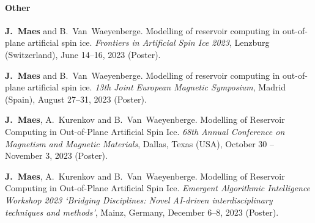 \paragraph*{Other}
\begin{itemize}
    \textbf{J.~Maes} and B.~Van~Waeyenberge.
    \newblock Modelling of reservoir computing in out-of-plane artificial spin ice.
    \newblock \emph{Frontiers in Artificial Spin Ice 2023}, Lenzburg (Switzerland), June 14--16, 2023 (Poster).

    \textbf{J.~Maes} and B.~Van~Waeyenberge.
    \newblock Modelling of reservoir computing in out-of-plane artificial spin ice.
    \newblock \emph{13th Joint European Magnetic Symposium}, Madrid (Spain), August 27--31, 2023 (Poster).

    \textbf{J.~Maes}, A.~Kurenkov and B.~Van~Waeyenberge.
    \newblock Modelling of Reservoir Computing in Out-of-Plane Artificial Spin Ice.
    \newblock \emph{68th Annual Conference on Magnetism and Magnetic Materials}, Dallas, Texas (USA), October 30 -- November 3, 2023 (Poster).

    \textbf{J.~Maes}, A.~Kurenkov and B.~Van~Waeyenberge.
    \newblock Modelling of Reservoir Computing in Out-of-Plane Artificial Spin Ice.
    \newblock \emph{Emergent Algorithmic Intelligence Workshop 2023 `Bridging Disciplines: Novel AI-driven interdisciplinary techniques and methods'}, Mainz, Germany, December 6--8, 2023 (Poster).
\end{itemize}
